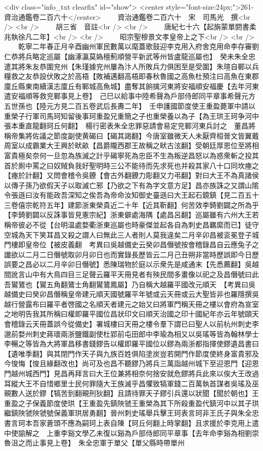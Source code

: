 <div class="info_txt clearfix" id="show">
<center style="font-size:24px;">261-資治通鑑卷二百六十</center>
  　　資治通鑑卷二百六十　宋　司馬光　撰<br />
<br />
　　胡三省　音註<br />
<br />
　　唐紀七十六【起旃蒙單閼書柔兆執徐凡二年】<br />
<br />
　　昭宗聖穆景文孝皇帝上之下<br />
<br />
　　乾寧二年春正月辛酉幽州軍民數萬以麾蓋歌鼓迎李克用入府舍克用命李存審劉仁恭將兵略定巡屬【幽涿瀛莫媯檀薊順營平新武等州皆盧龍巡屬也】　癸未朱全忠遣其將朱友恭圍兖州【朱瑾據兖州屢為汴人所敗兵力俱困至是受圍】朱瑄自鄆以兵糧救之友恭設伏敗之於高梧【敗補邁翻高梧即春秋魯國之高魚杜預注曰高魚在東郡廩丘縣東南續漢志廩丘有鄆城高魚城】盡奪其餉擒河東將安福順安福慶【去年河東遣安福順等救兖鄆事見上卷】　己巳以給事中陸希聲為戶部侍郎同平章事希聲元方五世孫也【陸元方見二百五卷武后長夀二年】　壬申護國節度使王重盈薨軍中請以重榮子行軍司馬珂知留後事珂重盈兄重簡之子也重榮養以為子【為王珙王珂争河中張本重直龍翻珂丘何翻】　楊行密表朱全忠罪惡請會易定兖鄆河東兵討之　董昌將稱帝集將佐議之節度副使黄碣曰【碣其謁翻】今唐室雖微天人未厭齊桓晉文皆翼戴周室以成霸業大王興於畎畝【昌爵隴西郡王故稱之畎古泫翻】受朝廷厚恩位至將相富貴極矣奈何一旦忽為族滅之計乎碣寧死為忠臣不生為叛逆昌怒以為惑衆斬之投其首於厠中罵之曰奴賊負我好聖明時三公不能待而先求死也并殺其家八十口同坎瘞之【瘞於計翻】又問會稽令吳鐐【會古外翻鐐力彫翻又力弔翻】對曰大王不為真諸侯以傳子孫乃欲假天子以取滅亡邪【乃欲之下有為字文意方足】昌亦族誅之又謂山隂令張遜曰汝有能政吾深知之俟吾為帝命汝知御史臺遜曰大王起石鏡鎮【見二百五十三卷僖宗乾符五年】建節浙東榮貴近二十年【近其靳翻】何苦效李錡劉闢之所為乎【李錡劉闢以反誅事皆見憲宗紀】浙東僻處海隅【處昌呂翻】巡屬雖有六州大王若稱帝彼必不從【台明温處婺衢浙東巡屬也時豪傑並起各自為刺史昌羈縻而已】徒守空城為天下笑耳昌又殺之謂人曰無此三人者則人莫我違矣二月辛卯昌被衮冕登子城門樓即皇帝位【被皮義翻　考異曰吳越備史云癸卯昌僭號按會稽錄昌自云應兔子之䜟欲以二月二日僭號取卯月卯日也而實錄長歷皆云二月己丑朔非當時歷誤即今日歷誤要之昌必以二月辛卯日僭號】悉陳瑞物於庭以示衆先是咸通末【先悉薦翻】吳越間訛言山中有大鳥四目三足聲云羅平天冊見者有殃民間多畫像以祀之及昌僭號曰此吾鸑鷟也【鸑五角翻鷟士角翻鸑鷟鳳屬】乃自稱大越羅平國改元順天　【考異曰吳越備史曰癸卯昌僭稱皇帝建元順天國號羅平年號或云天冊或云大聖皆非也羅隱撰吳越行營露布曰羅平者啓國之名順天者建元之始又曰將軍門稱天冊之樓以會府為宣室之地明告我其所稱曰權即羅平國位昌狀印文曰順天治國之印十國紀年亦云年號頤天會稽錄云天冊蓋誤今從備史】署城樓曰天冊之樓令羣下謂已曰聖人以前杭州刺史李邈前婺州刺史蔣瓌兩浙鹽鐵副使杜郢前屯田郎中李瑜為相又以吳瑤等皆為翰林學士李暢之等皆為大將軍昌移書錢鏐告以權即羅平國位以鏐為兩浙都指揮使鏐遺昌書曰【遺唯季翻】與其閉門作天子與九族百姓俱陷塗炭豈若開門作節度使終身富貴邪及今悛悔【悛且緣翻改也】尚可及也昌不聽鏐乃將兵三萬詣越州城下至迎恩門【迎恩門越州城西門】見昌再拜言曰大王位兼將相奈何捨安就危鏐將兵此來以俟大王改過耳縱大王不自惜鄉里士民何罪隨大王族滅乎昌懼致犒軍錢二百萬執首謀者吳瑤及巫覡數人送於鏐【犒苦到翻覡刑狄翻】且請待罪天子鏐引兵還以狀聞【聞於朝也】王重盈之子保義節度使珙【王重盈先鎮陜虢王重榮為其下所殺重盈代鎮河中以其子珙繼鎮陜虢陜虢號保義軍珙居勇翻】晉州刺史瑤舉兵擊王珂表言珂非王氏子與朱全忠書言珂本吾家蒼頭不應為嗣珂上表自陳【珂丘何翻上時掌翻】且求援於李克用上遣中使諭解之　上重李谿文學乙未復以谿為戶部侍郎同平章事【去年命李谿為相劉崇魯沮之而止事見上卷】　朱全忠軍于單父【單父縣時帶單州